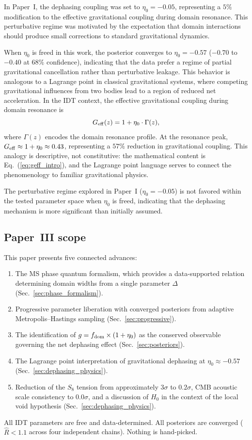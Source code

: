 \documentclass[aps,prd,twocolumn,superscriptaddress,nofootinbib]{revtex4-2}
\newcommand{\fdom}{f_{\rm dom}}
\newcommand{\Geff}{G_{\rm eff}}
\newcommand{\Hubble}{H_0}
\newcommand{\etaz}{\eta_0}
\newcommand{\Rhat}{\hat{R}}
\begin{document}
In Paper~I, the dephasing coupling was set to $\etaz = -0.05$,
representing a $5\%$ modification to the effective gravitational
coupling during domain resonance. This perturbative regime was
motivated by the expectation that domain interactions should produce
small corrections to standard gravitational dynamics.

When $\etaz$ is freed in this work, the posterior converges to
$\etaz = -0.57$ ($-0.70$ to $-0.40$ at $68\%$ confidence), indicating
that the data prefer a regime of partial gravitational cancellation
rather than perturbative leakage. This behavior is analogous to a
Lagrange point in classical gravitational systems, where competing
gravitational influences from two bodies lead to a region of reduced
net acceleration. In the IDT context, the effective gravitational
coupling during domain resonance is
\begin{equation}
\Geff(z) = 1 + \etaz \cdot \Gamma(z),
\label{eq:geff_intro}
\end{equation}
where $\Gamma(z)$ encodes the domain resonance profile. At the
resonance peak, $\Geff \approx 1 + \etaz \approx 0.43$, representing
a $57\%$ reduction in gravitational coupling. This analogy is
descriptive, not constitutive: the mathematical content is
Eq.~(\ref{eq:geff_intro}), and the Lagrange point language serves to
connect the phenomenology to familiar gravitational physics.

The perturbative regime explored in Paper~I ($\etaz = -0.05$) is not
favored within the tested parameter space when $\etaz$ is freed,
indicating that the dephasing mechanism is more significant than
initially assumed.

\subsection{Paper~III scope}
\label{sec:scope}

This paper presents five connected advances:
\begin{enumerate}
\item[(a)] The MS phase quantum formalism, which provides a
  data-supported relation determining domain widths from a single
  parameter $\Delta$ (Sec.~\ref{sec:phase_formalism}).
\item[(b)] Progressive parameter liberation with converged posteriors
  from adaptive Metropolis--Hastings sampling
  (Sec.~\ref{sec:progressive}).
\item[(c)] The identification of $g = \fdom \times (1 + \etaz)$ as
  the conserved observable governing the net dephasing effect
  (Sec.~\ref{sec:posteriors}).
\item[(d)] The Lagrange point interpretation of gravitational
  dephasing at $\etaz \approx -0.57$
  (Sec.~\ref{sec:dephasing_physics}).
\item[(e)] Reduction of the $S_8$ tension from approximately $3\sigma$
  to $0.2\sigma$, CMB acoustic scale consistency to $0.0\sigma$, and
  a discussion of $\Hubble$ in the context of the local void
  hypothesis (Sec.~\ref{sec:dephasing_physics}).
\end{enumerate}
All IDT parameters are free and data-determined. All posteriors are
converged ($\Rhat < 1.1$ across four independent chains). Nothing is
hand-picked.
\end{document}
